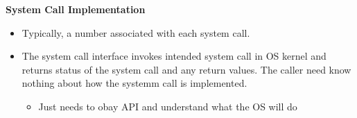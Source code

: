 \textbf{System Call Implementation}

\begin{itemize}
\item Typically, a number associated with each system call.
\item The system call interface invokes intended system call in OS kernel and returns status of the system call and any return values.
  The caller need know nothing about how the systemm call is implemented.
  \begin{itemize}
  \item Just needs to obay API and understand what the OS will do
  \end{itemize}
\end{itemize}